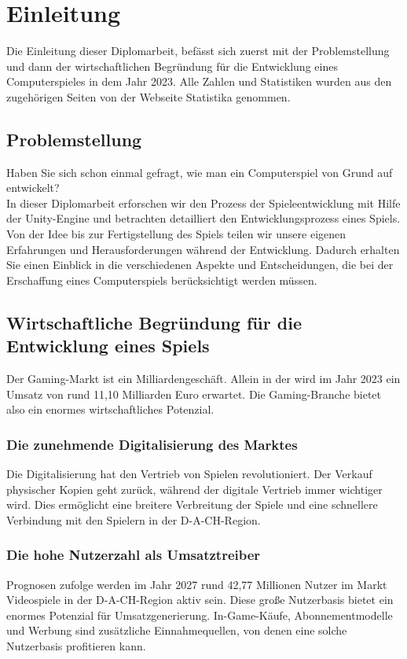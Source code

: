 \chapter{Einleitung}

Die Einleitung dieser Diplomarbeit, befässt sich zuerst mit der Problemstellung und dann der wirtschaftlichen Begründung für die Entwicklung eines Computerspieles in dem Jahr 2023. Alle Zahlen und Statistiken wurden aus den zugehörigen Seiten von der Webseite Statistika\cite{statistika} genommen.

\section{Problemstellung}
Haben Sie sich schon einmal gefragt, wie man ein Computerspiel von Grund auf entwickelt?
\\ In dieser Diplomarbeit erforschen wir den Prozess der Spieleentwicklung mit Hilfe der Unity-Engine und betrachten detailliert den Entwicklungsprozess eines Spiels. Von der Idee bis zur Fertigstellung des Spiels teilen wir unsere eigenen Erfahrungen und Herausforderungen während der Entwicklung. Dadurch erhalten Sie einen Einblick in die verschiedenen Aspekte und Entscheidungen, die bei der Erschaffung eines Computerspiels berücksichtigt werden müssen.

\pagebreak

\section{Wirtschaftliche Begründung für die Entwicklung eines Spiels}
Der Gaming-Markt ist ein Milliardengeschäft. Allein in der  wird im Jahr 2023 ein Umsatz von rund 11,10 Milliarden Euro erwartet. Die Gaming-Branche bietet also ein enormes wirtschaftliches Potenzial.

\subsection{Die zunehmende Digitalisierung des Marktes}
Die Digitalisierung hat den Vertrieb von Spielen revolutioniert. Der Verkauf physischer Kopien geht zurück, während der digitale Vertrieb immer wichtiger wird. Dies ermöglicht eine breitere Verbreitung der Spiele und eine schnellere Verbindung mit den Spielern in der D-A-CH-Region.

\subsection{Die hohe Nutzerzahl als Umsatztreiber}
Prognosen zufolge werden im Jahr 2027 rund 42,77 Millionen Nutzer im Markt Videospiele in der D-A-CH-Region aktiv sein. Diese große Nutzerbasis bietet ein enormes Potenzial für Umsatzgenerierung. In-Game-Käufe, Abonnementmodelle und Werbung sind zusätzliche Einnahmequellen, von denen eine solche Nutzerbasis profitieren kann.

